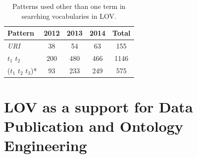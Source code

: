 \documentclass{iosart2c}
\begin{document}
\begin{table}[h!tb]
\caption{Patterns used other than one term in searching vocabularies in LOV.}
\begin{tabular}{lcccc}
\hline
\textbf{Pattern} & \textbf{2012} & \textbf{2013} & \textbf{2014} & \textbf{Total} \\ \hline
\textit{URI}  & 38   &  54  & 63  &  155      \\
$t_{1}$ $t_{2}$ & 200 & 480 & 466 & 1146 \\
($t_{1}$ $t_{2}$ $t_{3}$)* & 93 & 233 & 249 & 575\\
\hline  

\end{tabular}
\label{tab:patterns }
\end{table}

\begin{figure}[!htbp]
\end{figure}


\section{LOV as a support for Data Publication and Ontology Engineering}
\label{sec:dataPubOntoEngine}
\end{document}
